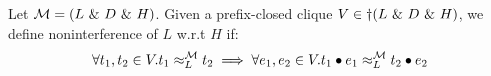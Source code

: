 \documentclass[acmsmall,screen,review, nonacm]{acmart}
\begin{document}
\medskip
\begin{definition}\label{def:relaxninew}
   Let $\classpart = (L \directprod D \directprod H)$. Given a prefix-closed clique $V \in \dagger(L \directprod D \directprod H)$, we define noninterference of $L$ w.r.t $H$ if:
   \[
   \forall t_1, t_2 \in V. \treq{t_1}{t_2}{L}{\classpart}  \implies \forall e_1, e_2 \in V. \treq{t_1  \tracecat  e_1}{t_2 \tracecat  e_2}{L}{\classpart}
   \]
\end{definition}


\begin{definition}\label{def:ni2}

  \mytodo{\dots}
  
\end{definition}





\end{document}
